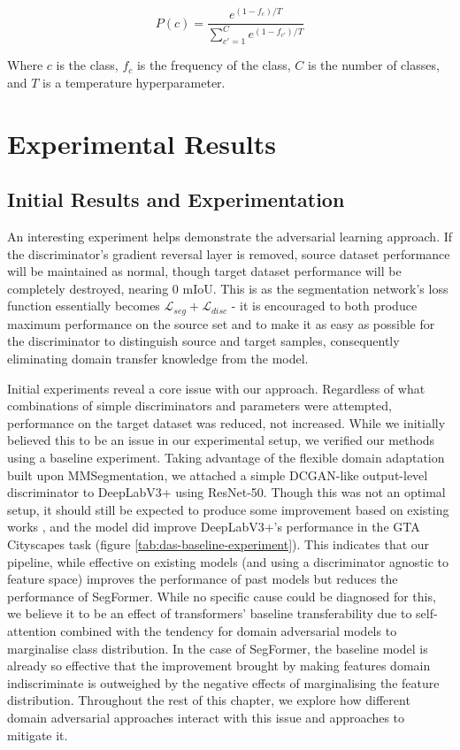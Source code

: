 \documentclass[a4paper,12pt]{report}
\begin{document}
\begin{equation}
    P(c) = \frac{e^{(1-f_c)/T}}{\sum_{c'=1}^{C}{e^{(1-f_{c'})/T}}}
\end{equation}

Where $c$ is the class, $f_c$ is the frequency of the class, $C$ is the number of classes, and $T$ is a temperature hyperparameter.

\section{Experimental Results}
\subsection{Initial Results and Experimentation}
An interesting experiment helps demonstrate the adversarial learning approach. If the discriminator's gradient reversal layer is removed, source dataset performance will be maintained as normal, though target dataset performance will be completely destroyed, nearing 0 mIoU. This is as the segmentation network's loss function essentially becomes $\mathcal{L}_{seg} + \mathcal{L}_{disc}$ - it is encouraged to both produce maximum performance on the source set and to make it as easy as possible for the discriminator to distinguish source and target samples, consequently eliminating domain transfer knowledge from the model.

Initial experiments reveal a core issue with our approach. Regardless of what combinations of simple discriminators and parameters were attempted, performance on the target dataset was reduced, not increased. While we initially believed this to be an issue in our experimental setup, we verified our methods using a baseline experiment. Taking advantage of the flexible domain adaptation built upon MMSegmentation, we attached a simple DCGAN-like output-level discriminator to DeepLabV3+ using ResNet-50. Though this was not an optimal setup, it should still be expected to produce some improvement based on existing works \cite{tsai_learning_2020}, and the model did improve DeepLabV3+'s performance in the GTA \textrightarrow Cityscapes task (figure \ref{tab:das-baseline-experiment}). This indicates that our pipeline, while effective on existing models (and using a discriminator agnostic to feature space) improves the performance of past models but reduces the performance of SegFormer. While no specific cause could be diagnosed for this, we believe it to be an effect of transformers' baseline transferability due to self-attention \cite{dosovitskiy_image_2021} combined with the tendency for domain adversarial models to marginalise class distribution. In the case of SegFormer, the baseline model is already so effective that the improvement brought by making features domain indiscriminate is outweighed by the negative effects of marginalising the feature distribution. Throughout the rest of this chapter, we explore how different domain adversarial approaches interact with this issue and approaches to mitigate it.
\end{document}
